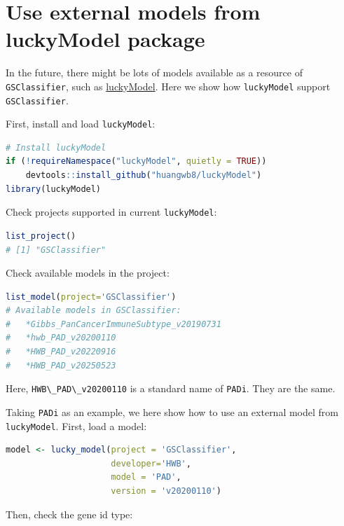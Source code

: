 \documentclass[
  12pt,
]{book}
\newcommand{\passthrough}[1]{#1}
\begin{document}
\hypertarget{use-external-models-from-luckymodel-package}{%
\section{Use external models from luckyModel package}\label{use-external-models-from-luckymodel-package}}

In the future, there might be lots of models available as a resource of \passthrough{\lstinline!GSClassifier!}, such as \href{https://github.com/huangwb8/luckyModel}{luckyModel}. Here we show how \passthrough{\lstinline!luckyModel!} support \passthrough{\lstinline!GSClassifier!}.

First, install and load \passthrough{\lstinline!luckyModel!}:

\begin{lstlisting}[language=R]
# Install luckyModel
if (!requireNamespace("luckyModel", quietly = TRUE))
    devtools::install_github("huangwb8/luckyModel")
library(luckyModel)
\end{lstlisting}

Check projects supported in current \passthrough{\lstinline!luckyModel!}:

\begin{lstlisting}[language=R]
list_project()
# [1] "GSClassifier"
\end{lstlisting}

Check available models in the project:

\begin{lstlisting}[language=R]
list_model(project='GSClassifier')
# Available models in GSClassifier:
#   *Gibbs_PanCancerImmuneSubtype_v20190731
#   *hwb_PAD_v20200110
#   *HWB_PAD_v20220916
#   *HWB_PAD_v20250523
\end{lstlisting}

Here, \passthrough{\lstinline!HWB\_PAD\_v20200110!} is a standard name of \passthrough{\lstinline!PADi!}. They are the same.

Taking \passthrough{\lstinline!PADi!} as an example, we here show how to use an external model from \passthrough{\lstinline!luckyModel!}. First, load a model:

\begin{lstlisting}[language=R]
model <- lucky_model(project = 'GSClassifier',
                     developer='HWB',
                     model = 'PAD',
                     version = 'v20200110')
\end{lstlisting}

Then, check the gene id type:
\end{document}
